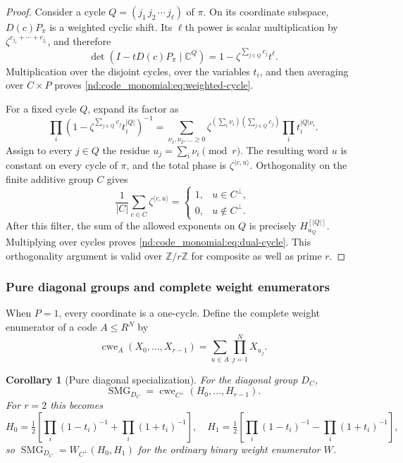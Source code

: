 \documentclass[10pt]{article}
\newcommand{\SMG}{\operatorname{SMG}}
\newcommand{\MGF}{\SMG}
\newcommand{\C}{\mathbb C}
\newcommand{\Z}{\mathbb Z}
\newcommand{\cwe}{\operatorname{cwe}}
\newtheorem{corollary}{Corollary}
\begin{document}
\begin{proof}
Consider a cycle $Q=(j_1\,j_2\,\cdots\,j_\ell)$ of $\pi$.  On its
coordinate subspace, $D(c)P_\pi$ is a weighted cyclic shift.  Its $\ell$th
power is scalar multiplication by
$\zeta^{c_{j_1}+\cdots+c_{j_\ell}}$, and therefore
\[
 \det(I-tD(c)P_\pi\mid\C^Q)
 =1-\zeta^{\sum_{j\in Q}c_j}t^\ell.
\]
Multiplication over the disjoint cycles, over the variables $t_i$, and then
averaging over $C\times P$ proves \eqref{nd:code_monomial:eq:weighted-cycle}.

For a fixed cycle $Q$, expand its factor as
\[
 \prod_i\left(1-\zeta^{\sum_{j\in Q}c_j}t_i^{|Q|}\right)^{-1}
 =\sum_{\nu_1,\nu_2,\ldots\geq0}
  \zeta^{(\sum_i\nu_i)(\sum_{j\in Q}c_j)}
  \prod_i t_i^{|Q|\nu_i}.
\]
Assign to every $j\in Q$ the residue
$u_j=\sum_i\nu_i\pmod r$.  The resulting word $u$ is constant on every
cycle of $\pi$, and the total phase is $\zeta^{\langle c,u\rangle}$.
Orthogonality on the finite additive group $C$ gives
\[
 \frac1{|C|}\sum_{c\in C}\zeta^{\langle c,u\rangle}
 =\begin{cases}1,&u\in C^\perp,\\0,&u\notin C^\perp.\end{cases}
\]
After this filter, the sum of the allowed exponents on $Q$ is precisely
$H_{u_Q}^{[|Q|]}$.  Multiplying over cycles proves
\eqref{nd:code_monomial:eq:dual-cycle}.  This orthogonality argument is valid over
$\Z/r\Z$ for composite as well as prime $r$.
\end{proof}

\subsubsection{Pure diagonal groups and complete weight enumerators}

When $P=1$, every coordinate is a one-cycle.  Define the complete weight
enumerator of a code $A\leq R^N$ by
\[
 \cwe_A(X_0,\ldots,X_{r-1})
 =\sum_{u\in A}\prod_{j=1}^N X_{u_j}.
\]

\begin{corollary}[Pure diagonal specialization]\label{nd:code_monomial:cor:cwe}
For the diagonal group $D_C$,
\begin{equation}\label{nd:code_monomial:eq:cwe}
 \boxed{\MGF_{D_C}=\cwe_{C^\perp}(H_0,\ldots,H_{r-1}).}
\end{equation}
For $r=2$ this becomes
\[
 H_0=\tfrac12\left[\prod_i(1-t_i)^{-1}+\prod_i(1+t_i)^{-1}\right],
 \quad
 H_1=\tfrac12\left[\prod_i(1-t_i)^{-1}-\prod_i(1+t_i)^{-1}\right],
\]
so $\MGF_{D_C}=W_{C^\perp}(H_0,H_1)$ for the ordinary binary weight
enumerator $W$.
\end{corollary}
\end{document}
